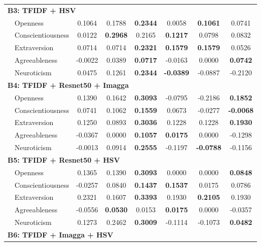 \begin{longtable}{llcccccc}
\hline
\multicolumn{8}{l}{\textbf{B3: TFIDF + HSV}} \\

& Openness & 0.1064 & 0.1788 & \textbf{0.2344} & 0.0058 & \textbf{0.1061} & 0.0741 \\
& Conscientiousness & 0.0122 & \textbf{0.2968} & 0.2165 & \textbf{0.1217} & 0.0798 & 0.0832 \\
& Extraversion & 0.0714 & 0.0714 & \textbf{0.2321} & \textbf{0.1579} & \textbf{0.1579} & 0.0526 \\
& Agreeableness & -0.0022 & 0.0389 & \textbf{0.0717} & -0.0163 & 0.0000 & \textbf{0.0742} \\
& Neuroticism & 0.0475 & 0.1261 & \textbf{0.2344} & \textbf{-0.0389} & -0.0887 & -0.2120 \\

\hline
\multicolumn{8}{l}{\textbf{B4: TFIDF + Resnet50 + Imagga}} \\

& Openness & 0.1390 & 0.1642 & \textbf{0.3093} & -0.0795 & -0.2186 & \textbf{0.1852} \\
& Conscientiousness & 0.0741 & 0.1062 & \textbf{0.1559} & 0.0673 & -0.0277 & \textbf{-0.0068} \\
& Extraversion & 0.1250 & 0.0893 & \textbf{0.3036} & 0.1228 & 0.1228 & \textbf{0.1930} \\
& Agreeableness & -0.0367 & 0.0000 & \textbf{0.1057} & \textbf{0.0175} & 0.0000 & -0.1298 \\
& Neuroticism & -0.0013 & 0.0914 & \textbf{0.2555} & -0.1197 & \textbf{-0.0788} & -0.1156 \\

\hline
\multicolumn{8}{l}{\textbf{B5: TFIDF + Resnet50 + HSV}} \\

& Openness & 0.1365 & 0.1390 & \textbf{0.3093} & 0.0000 & 0.0000 & \textbf{0.0848} \\
& Conscientiousness & -0.0257 & 0.0840 & \textbf{0.1437} & \textbf{0.1537} & 0.0175 & 0.0786 \\
& Extraversion & 0.2321 & 0.1607 & \textbf{0.3393} & 0.1930 & \textbf{0.2105} & 0.1930 \\
& Agreeableness & -0.0556 & \textbf{0.0530} & 0.0153 & \textbf{0.0175} & 0.0000 & -0.0357 \\
& Neuroticism & 0.1273 & 0.2462 & \textbf{0.3009} & -0.1114 & -0.1073 & \textbf{0.0482} \\

\hline
\multicolumn{8}{l}{\textbf{B6: TFIDF + Imagga + HSV}} \\


\end{longtable}
